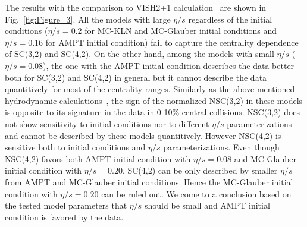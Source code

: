 The results with the comparison to VISH2+1 calculation~\cite{Zhu:2016puf} are shown in Fig.~\ref{fig:Figure_3}.  All the models with large $\eta/s$ regardless of the initial conditions ($\eta/s=0.2$ for MC-KLN and MC-Glauber initial conditions and $\eta/s=0.16$ for AMPT initial condition) fail to capture the centrality dependence of SC(3,2) and SC(4,2). 
On the other hand, among the models with small $\eta/s$ ($\eta/s=0.08$), the one with the AMPT initial condition describes the data better both for SC(3,2) and SC(4,2) in general but it cannot describe the data quantitively for most of the centrality ranges.
Similarly as the above mentioned hydrodynamic calculations~\cite{Niemi:2015qia}, the sign of the normalized NSC(3,2) in these models is opposite to its signature in the data in 0-10\% central collisions. NSC(3,2) does not show sensitivity to initial conditions nor to different $\eta/s$ parameterizations and cannot be described by these models quantitively.
However NSC(4,2) is sensitive both to initial conditions and $\eta/s$ parameterizations.
Even though NSC(4,2) favors both AMPT initial condition with $\eta/s=0.08$ and MC-Glauber initial condition with $\eta/s=0.20$,
SC(4,2) can be only described by smaller $\eta/s$ from AMPT and MC-Glauber initial conditions. Hence the MC-Glauber initial condition with $\eta/s=0.20$ can be ruled out. We come to a conclusion based on the tested model parameters that $\eta/s$ should be small and AMPT initial condition is favored by the data.

